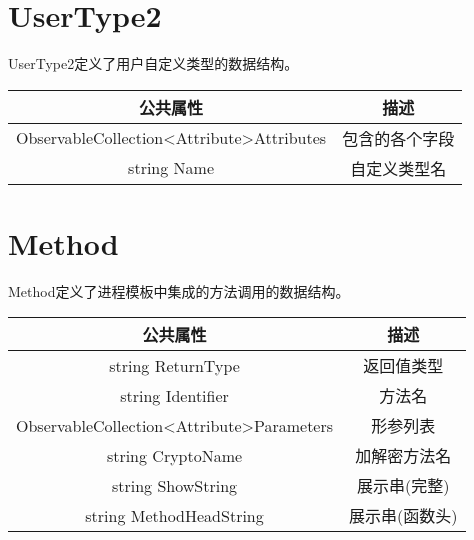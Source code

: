 \section{UserType2}
UserType2定义了用户自定义类型的数据结构。
\begin{table}[h]
	\centering
	\begin{tabular}{|c|c|}
		\hline
		\textbf{公共属性}                                                   & \textbf{描述} \\ \hline
		ObservableCollection\textless{}Attribute\textgreater Attributes & 包含的各个字段     \\ \hline
		string Name                                                     & 自定义类型名      \\ \hline
	\end{tabular}
\end{table}

\section{Method}
Method定义了进程模板中集成的方法调用的数据结构。
\begin{table}[h]
	\centering
	\begin{tabular}{|c|c|}
		\hline
		\textbf{公共属性}                                                   & \textbf{描述} \\ \hline
		string ReturnType                                               & 返回值类型       \\ \hline
		string Identifier                                               & 方法名         \\ \hline
		ObservableCollection\textless{}Attribute\textgreater Parameters & 形参列表        \\ \hline
		string CryptoName                                               & 加解密方法名      \\ \hline
		string ShowString                                               & 展示串(完整)     \\ \hline
		string MethodHeadString                                         & 展示串(函数头)    \\ \hline
	\end{tabular}
\end{table}

